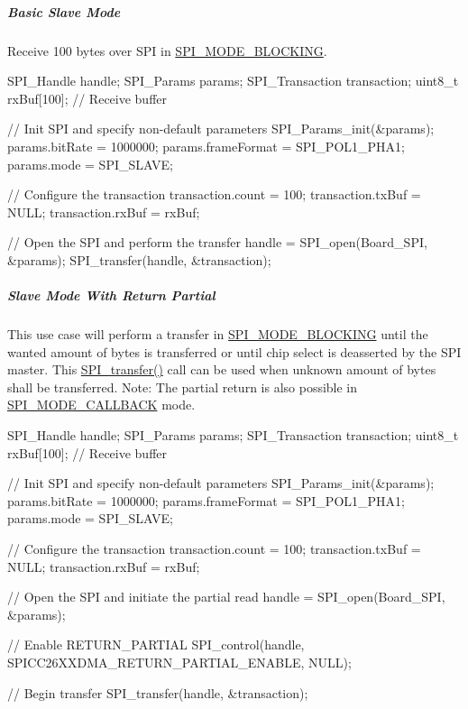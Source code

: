 \subparagraph*{Basic Slave Mode}

Receive 100 bytes over S\+P\+I in \hyperlink{_s_p_i_8h_ab9ea76c6529d6076eee5e1c4a5a92c6fa0dfb2358e008316426895e7237c398e8}{S\+P\+I\+\_\+\+M\+O\+D\+E\+\_\+\+B\+L\+O\+C\+K\+I\+N\+G}. 
\begin{DoxyCode}
SPI_Handle handle;
SPI_Params params;
SPI_Transaction transaction;
uint8\_t rxBuf[100];     \textcolor{comment}{// Receive buffer}

\textcolor{comment}{// Init SPI and specify non-default parameters}
SPI_Params_init(&params);
params.bitRate     = 1000000;
params.frameFormat = SPI_POL1_PHA1;
params.mode        = SPI_SLAVE;

\textcolor{comment}{// Configure the transaction}
transaction.count = 100;
transaction.txBuf = NULL;
transaction.rxBuf = rxBuf;

\textcolor{comment}{// Open the SPI and perform the transfer}
handle = SPI_open(Board\_SPI, &params);
SPI_transfer(handle, &transaction);
\end{DoxyCode}


\subparagraph*{Slave Mode With Return Partial\label{_s_p_i_c_c26_x_x_d_m_a_8h_USE_CASE_RP}%
\hypertarget{_s_p_i_c_c26_x_x_d_m_a_8h_USE_CASE_RP}{}%
}

This use case will perform a transfer in \hyperlink{_s_p_i_8h_ab9ea76c6529d6076eee5e1c4a5a92c6fa0dfb2358e008316426895e7237c398e8}{S\+P\+I\+\_\+\+M\+O\+D\+E\+\_\+\+B\+L\+O\+C\+K\+I\+N\+G} until the wanted amount of bytes is transferred or until chip select is deasserted by the S\+P\+I master. This \hyperlink{_s_p_i_8h_a989e17f96b54fcc3dc2cac5f8ac6bdb2}{S\+P\+I\+\_\+transfer()} call can be used when unknown amount of bytes shall be transferred. Note\+: The partial return is also possible in \hyperlink{_s_p_i_8h_ab9ea76c6529d6076eee5e1c4a5a92c6fa5631e69925c47a62a261c78ebbda39fb}{S\+P\+I\+\_\+\+M\+O\+D\+E\+\_\+\+C\+A\+L\+L\+B\+A\+C\+K} mode. 
\begin{DoxyCode}
SPI_Handle handle;
SPI_Params params;
SPI_Transaction transaction;
uint8\_t rxBuf[100];     \textcolor{comment}{// Receive buffer}

\textcolor{comment}{// Init SPI and specify non-default parameters}
SPI_Params_init(&params);
params.bitRate     = 1000000;
params.frameFormat = SPI_POL1_PHA1;
params.mode        = SPI_SLAVE;

\textcolor{comment}{// Configure the transaction}
transaction.count = 100;
transaction.txBuf = NULL;
transaction.rxBuf = rxBuf;

\textcolor{comment}{// Open the SPI and initiate the partial read}
handle = SPI_open(Board\_SPI, &params);

\textcolor{comment}{// Enable RETURN\_PARTIAL}
SPI_control(handle, SPICC26XXDMA_RETURN_PARTIAL_ENABLE, NULL);

\textcolor{comment}{// Begin transfer}
SPI_transfer(handle, &transaction);
\end{DoxyCode}


